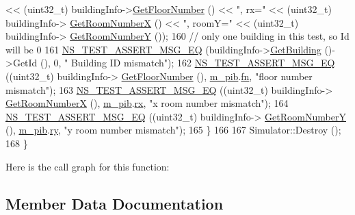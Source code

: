\begin{DoxyCode}
      << (uint32\_t) buildingInfo->\hyperlink{classns3_1_1MobilityBuildingInfo_aedb2647206f2dae0aa98ec9ac11873c7}{GetFloorNumber} () << \textcolor{stringliteral}{", rx="} << (uint32\_t) buildingInfo->
      \hyperlink{classns3_1_1MobilityBuildingInfo_ad40faf32d419734e8c86f630e66ab18d}{GetRoomNumberX} () << \textcolor{stringliteral}{", roomY="} << (uint32\_t) buildingInfo->
      \hyperlink{classns3_1_1MobilityBuildingInfo_a5297704859be8e1d3ad22ea3f5f93dbd}{GetRoomNumberY} ());
160       \textcolor{comment}{// only one building in this test, so Id will be 0}
161       \hyperlink{group__testing_ga2a9d78cffb3db8e867c35fff0b698cf5}{NS\_TEST\_ASSERT\_MSG\_EQ} (buildingInfo->\hyperlink{classns3_1_1MobilityBuildingInfo_a15d4ac25e557d51b356610354c70c6fb}{GetBuilding} ()->GetId (), 0, \textcolor{stringliteral}{"
      Building ID mismatch"});
162       \hyperlink{group__testing_ga2a9d78cffb3db8e867c35fff0b698cf5}{NS\_TEST\_ASSERT\_MSG\_EQ} ((uint32\_t) buildingInfo->
      \hyperlink{classns3_1_1MobilityBuildingInfo_aedb2647206f2dae0aa98ec9ac11873c7}{GetFloorNumber} (), \hyperlink{classBuildingsHelperOneTestCase_aab8bca809365d6613287ffa50e946bb2}{m\_pib}.\hyperlink{structPositionInBuilding_ad85d460446c8fa65ef019fa48717746a}{fn}, \textcolor{stringliteral}{"floor number mismatch"});
163       \hyperlink{group__testing_ga2a9d78cffb3db8e867c35fff0b698cf5}{NS\_TEST\_ASSERT\_MSG\_EQ} ((uint32\_t) buildingInfo->
      \hyperlink{classns3_1_1MobilityBuildingInfo_ad40faf32d419734e8c86f630e66ab18d}{GetRoomNumberX} (), \hyperlink{classBuildingsHelperOneTestCase_aab8bca809365d6613287ffa50e946bb2}{m\_pib}.\hyperlink{structPositionInBuilding_a6ad799c04d47c445f10ea9c58319ee65}{rx}, \textcolor{stringliteral}{"x room number mismatch"});
164       \hyperlink{group__testing_ga2a9d78cffb3db8e867c35fff0b698cf5}{NS\_TEST\_ASSERT\_MSG\_EQ} ((uint32\_t) buildingInfo->
      \hyperlink{classns3_1_1MobilityBuildingInfo_a5297704859be8e1d3ad22ea3f5f93dbd}{GetRoomNumberY} (), \hyperlink{classBuildingsHelperOneTestCase_aab8bca809365d6613287ffa50e946bb2}{m\_pib}.\hyperlink{structPositionInBuilding_a9fd3cce30dc7000c482ef12229cafef0}{ry}, \textcolor{stringliteral}{"y room number mismatch"});
165     \}
166 
167   Simulator::Destroy ();  
168 \}
\end{DoxyCode}


Here is the call graph for this function\+:




\subsection{Member Data Documentation}
